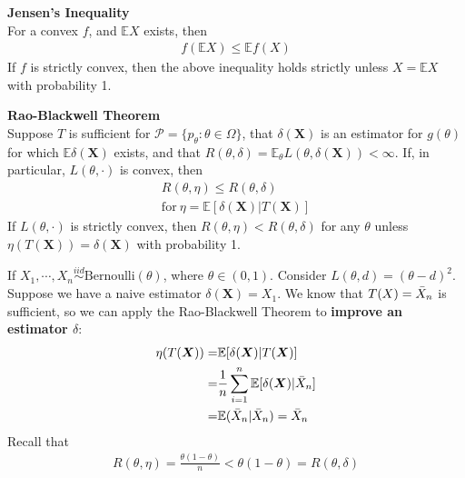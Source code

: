 \begin{theorem}
    \textbf{Jensen's Inequality}\\
    For a convex $f$, and $\mathbb{E}X$ exists, then
    \begin{gather}
        f(\mathbb{E}X)\leq\mathbb{E}f(X)
    \end{gather}
    If $f$ is strictly convex, then the above inequality holds strictly unless 
    $X=\mathbb{E}X$ with probability 1.
\end{theorem}


\begin{theorem}\label{thm:raoblackwell}
    \textbf{Rao-Blackwell Theorem}\\
    Suppose $T$ is sufficient for $\mathcal{P}=\{p_\theta: \theta\in\Omega\}$,
    that $\delta(\boldsymbol{X})$ is an estimator for $g(\theta)$ for which $\mathbb{E}\delta(\boldsymbol{X})$ exists,
    and that $R(\theta,\delta)=\mathbb{E}_\theta L(\theta,\delta(\boldsymbol{X}))<\infty$.
    If, in particular, $L(\theta,\cdot)$ is convex, then
    \begin{gather}
        R(\theta, \eta)\leq R(\theta,\delta)\\
        \text{for}~\eta=\mathbb{E}[\delta(\boldsymbol{X})|T(\boldsymbol{X})]
    \end{gather}
    If $L(\theta,\cdot)$ is strictly convex, then $R(\theta,\eta)<R(\theta,\delta)$
    for any $\theta$ unless $\eta(T(\boldsymbol{X}))=\delta(\boldsymbol{X})$ with probability 1.
\end{theorem}


\begin{example}
    If $X_1,\cdots,X_n\overset{iid}{\sim}\text{Bernoulli}(\theta)$, where $\theta\in(0,1)$.
    Consider $L(\theta,d)=(\theta-d)^2$. 
    Suppose we have a naive estimator $\delta(\boldsymbol{X})=X_1$.
    We know that $T(X)=\Bar{X}_n$ is sufficient,
    so we can apply the Rao-Blackwell Theorem to \textbf{improve an estimator $\delta$}:
    \begin{align}
        \eta(T(\boldsymbol{X}))
        =& \mathbb{E}[\delta(\boldsymbol{X})|T(\boldsymbol{X})]\\
        =& \frac{1}{n}\sum_{i=1}^n\mathbb{E}[\delta(\boldsymbol{X})|\Bar{X}_n]\\
        =& \mathbb{E}(\Bar{X}_n|\Bar{X}_n) = \Bar{X}_n
    \end{align}
    Recall that 
    \begin{gather}
        R(\theta,\eta)=\frac{\theta(1-\theta)}{n}<\theta(1-\theta)=R(\theta,\delta)
    \end{gather}
\end{example}

\newpage